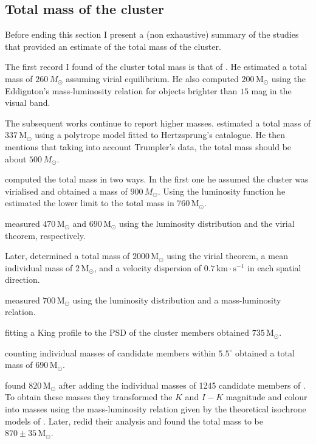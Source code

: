\subsection{Total mass of the cluster}
Before ending this section I present a (non exhaustive) summary of the studies that provided an estimate of the total mass of the cluster.

The first record I found of the cluster total mass is that of \citet{1938AJ.....47...25T}. He estimated a total mass of $260 \,M_{\odot}$ assuming virial equilibrium. He also computed $200 \,\mathrm{M_{\odot}}$ using the Eddignton's mass-luminosity relation for objects brighter than $15$ mag in the visual band.

The subsequent works continue to report higher masses. \citet{1956MNRAS.116..296W} estimated a total mass of $337 \,\mathrm{M_{\odot}}$ using a polytrope model fitted to Hertzsprung's catalogue. He then mentions that taking into account Trumpler's data, the total mass should be about $500\,M_{\odot}$. 

\citet{Limber1962} computed the total mass in two ways. In the first one he assumed the cluster was virialised and obtained a mass of $900 \,M_{\odot}$. Using the luminosity function he estimated the lower limit to the total mass in $760 \,\mathrm{M_{\odot}}$. 

\citet{1970AJ.....75..563J} measured $470\,\mathrm{M_{\odot}}$ and $690\,\mathrm{M_{\odot}}$ using the luminosity distribution and the virial theorem, respectively. 

Later, \citet{1980IAUS...85..157V}  determined a total mass of $2000 \,\mathrm{M_{\odot}}$ using the virial theorem, a mean individual mass of $2\,\mathrm{M_{\odot}}$, and a velocity dispersion of $0.7\,\mathrm{km \cdot s^{-1}}$ in each spatial direction. 

\citet{1995JKAS...28...45L} measured $700 \,\mathrm{M_{\odot}}$ using the luminosity distribution and a mass-luminosity relation. 

\citet{Pinfield1998} fitting a King profile to the PSD of the cluster members obtained $735\,\mathrm{M_{\odot}}$. 

\citet{Adams2001} counting individual masses of candidate members within $5.5^{\circ}$ obtained a total mass of $690 \,\mathrm{M_{\odot}}$. 

\citet{Converse2008} found $820 \,\mathrm{M_{\odot}}$ after adding the individual masses of 1245  candidate members of \citet{Stauffer2007}. To obtain these masses they  transformed the $K$ and $I-K$ magnitude and colour into masses using the mass-luminosity relation given by the theoretical isochrone models of \citet{1998A&A...337..403B}. Later, \citet{Converse2010} redid their analysis and found the total mass to be $870\pm35\,\mathrm{M_{\odot}}$.

